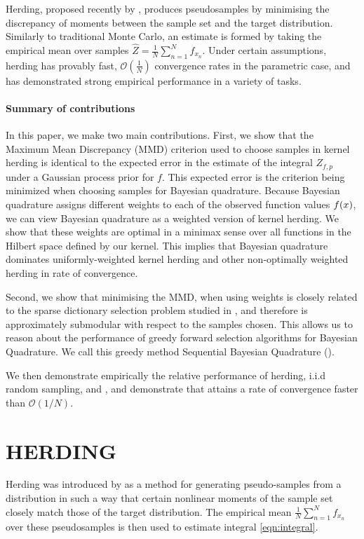 \documentclass[]{article}
\begin{document}
Herding, proposed recently by \cite{chen2010super}, produces pseudosamples by minimising the discrepancy of moments between the sample set and the target distribution. Similarly to traditional Monte Carlo, an estimate is formed by taking the empirical mean over samples $\hat{Z} = \frac{1}{N}\sum_{n=1}^{N}f_{x_n}$. Under certain assumptions, herding has provably fast, $\mathcal{O}(\frac{1}{N})$ convergence rates in the parametric case, and has demonstrated strong empirical performance in a variety of tasks.

\paragraph{Summary of contributions} In this paper, we make two main contributions.  First, we show that the Maximum Mean Discrepancy (MMD) criterion used to choose samples in kernel herding is identical to the expected error in the estimate of the integral $Z_{f,p}$ under a Gaussian process prior for $f$.  This expected error is the criterion being minimized when choosing samples for Bayesian quadrature.  Because Bayesian quadrature assigns different weights to each of the observed function values $f({x})$, we can view Bayesian quadrature as a weighted version of kernel herding.  We show that these weights are optimal in a minimax sense over all functions in the Hilbert space defined by our kernel.  This implies that Bayesian quadrature dominates uniformly-weighted kernel herding and other non-optimally weighted herding in rate of convergence.

Second, we show that minimising the MMD, when using \bq{} weights is closely related to the sparse dictionary selection problem studied in \citep{KrauseCevher10}, and therefore is approximately submodular with respect to the samples chosen. This allows us to reason about the performance of greedy forward selection algorithms for Bayesian Quadrature. We call this greedy method Sequential Bayesian Quadrature (\sbq{}).

We then demonstrate empirically the relative performance of herding, i.i.d random sampling, and \sbq{}, and demonstrate that \sbq{} attains a rate of convergence faster than $\mathcal{O}(1/N)$.



\section{HERDING} 

Herding was introduced by \cite{welling2009herding} as a method for generating pseudo-samples from a distribution in such a way that certain nonlinear moments of the sample set closely match those of the target distribution.  The empirical mean $\frac{1}{N}\sum_{n=1}^{N}f_{x_n}$ over these pseudosamples is then used to estimate integral \eqref{eqn:integral}.
\end{document}
